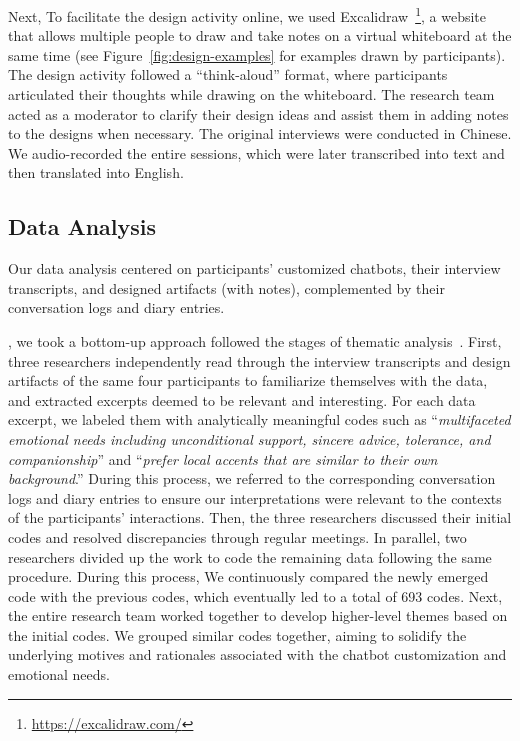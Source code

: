 Next, 
To facilitate the design activity online, we used Excalidraw~\footnote{\url{https://excalidraw.com/}}, a website that allows multiple people to draw and take notes on a virtual whiteboard at the same time (see Figure~\ref{fig:design-examples} for examples drawn by participants).
The design activity followed a ``think-aloud'' format, where participants articulated their thoughts while drawing on the whiteboard. The research team acted as a moderator to clarify their design ideas and assist them in adding notes to the designs when necessary. The original interviews were conducted in Chinese. We audio-recorded the entire sessions, which were later transcribed into text and then translated into English.

\subsection{Data Analysis}
Our data analysis centered on participants' customized chatbots, their interview transcripts, and designed artifacts (with notes), complemented by their conversation logs and diary entries. 



, we took a bottom-up approach  followed the stages of thematic analysis~\cite{braun2006using}. First, three researchers independently read through the interview transcripts and design artifacts of the same four participants to familiarize themselves with the data, and extracted excerpts deemed to be relevant and interesting. 
For each data excerpt, we labeled them with analytically meaningful codes such as ``\textit{multifaceted emotional needs including unconditional support, sincere advice, tolerance, and companionship}'' and ``\textit{prefer local accents that are similar to their own background}.'' During this process, we referred to the corresponding conversation logs and diary entries to ensure our interpretations were relevant to the contexts of the participants' interactions.
Then, the three researchers discussed their initial codes and resolved discrepancies through regular meetings. 
In parallel, two researchers divided up the work to code the remaining data following the same procedure. During this process, We continuously compared the newly emerged code with the previous codes, which eventually led to a total of 693 codes. 
Next, the entire research team worked together to develop higher-level themes based on the initial codes. 
We grouped similar codes together, aiming to solidify the underlying motives and rationales associated with the chatbot customization and emotional needs.

